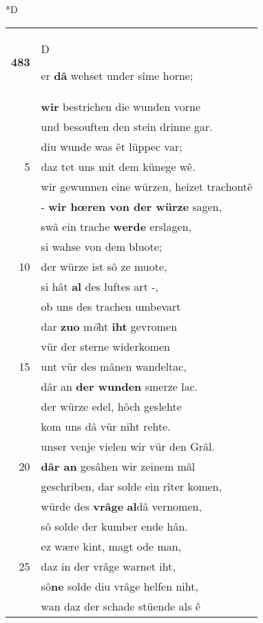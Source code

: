 \documentclass[8pt,a4paper,notitlepage]{article}
\begin{document}
\begin{table}[ht]
\begin{minipage}[t]{0.5\linewidth}
\small
\begin{center}*D
\end{center}
\begin{tabular}{rl}
\textbf{483} & \begin{large}D\end{large}er \textbf{dâ} wehset under sîme horne;\\ 
 & \textbf{wir} bestrichen die wunden vorne\\ 
 & und besouften den stein drinne gar.\\ 
 & diu wunde was êt lüppec var;\\ 
5 & daz tet uns mit dem künege wê.\\ 
 & wir gewunnen eine würzen, heizet trachontê\\ 
 & - \textbf{wir hœren von der würze} sagen,\\ 
 & swâ ein trache \textbf{werde} erslagen,\\ 
 & si wahse von dem bluote;\\ 
10 & der würze ist sô ze muote,\\ 
 & si hât \textbf{al} des luftes art -,\\ 
 & ob uns des trachen umbevart\\ 
 & dar \textbf{zuo} m\textit{ö}ht \textbf{iht} gevromen\\ 
 & vür der sterne widerkomen\\ 
15 & unt vür des mânen wandeltac,\\ 
 & dâr an \textbf{der wunden} smerze lac.\\ 
 & der würze edel, hôch geslehte\\ 
 & kom uns dâ vür niht rehte.\\ 
 & unser venje vielen wir vür den Grâl.\\ 
20 & \textbf{dâr an} gesâhen wir zeinem mâl\\ 
 & geschriben, dar solde ein rîter komen,\\ 
 & würde des \textbf{vrâge} \textbf{al}dâ vernomen,\\ 
 & sô solde der kumber ende hân.\\ 
 & ez wære kint, magt ode man,\\ 
25 & daz in der vrâge warnet iht,\\ 
 & sô\textbf{ne} solde diu vrâge helfen niht,\\ 
 & wan daz der schade stüende als ê\\ 

\end{tabular}
\end{minipage}
\end{table}
\end{document}
